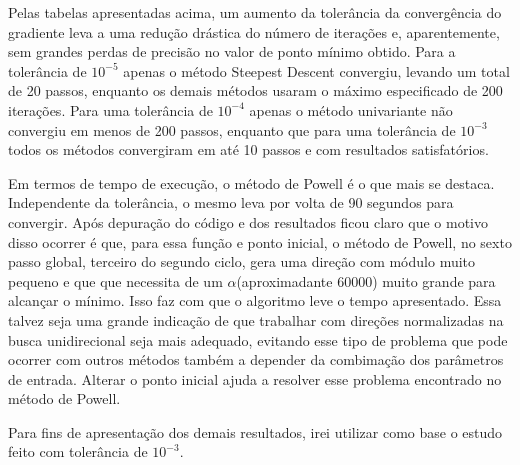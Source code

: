 \documentclass[10pt, a4paper]{article}
\begin{document}
Pelas tabelas apresentadas acima, um aumento da tolerância da convergência do gradiente leva a uma redução drástica
do número de iterações e, aparentemente, sem grandes perdas de precisão no valor de ponto mínimo obtido. Para a 
tolerância de $10^{-5}$ apenas o método Steepest Descent convergiu, levando um total de 20 passos, enquanto os 
demais métodos usaram o máximo especificado de 200 iterações. Para uma tolerância de $10^{-4}$ apenas o método univariante
não convergiu em menos de 200 passos, enquanto que para uma tolerância de $10^{-3}$ todos os métodos convergiram em até 10
passos e com resultados satisfatórios.

Em termos de tempo de execução, o método de Powell é o que mais se destaca. Independente da tolerância, o mesmo leva por volta
de 90 segundos para convergir. Após depuração do código e dos resultados ficou claro que o motivo disso ocorrer é que, 
para essa função e ponto inicial, o método de Powell, no sexto passo global, terceiro do segundo ciclo, gera uma direção com módulo muito pequeno e que
que necessita de um $\alpha$(aproximadante 60000) muito grande para alcançar o mínimo. Isso faz com que o algoritmo leve o tempo apresentado.
Essa talvez seja uma grande indicação de que trabalhar com direções normalizadas na busca unidirecional
seja mais adequado, evitando esse tipo de problema que pode ocorrer com outros métodos também a depender da combimação 
dos parâmetros de entrada. Alterar o ponto inicial ajuda a resolver esse problema encontrado no método de Powell.

Para fins de apresentação dos demais resultados, irei utilizar como base o estudo feito com tolerância de $10^{-3}$.




\end{document}
